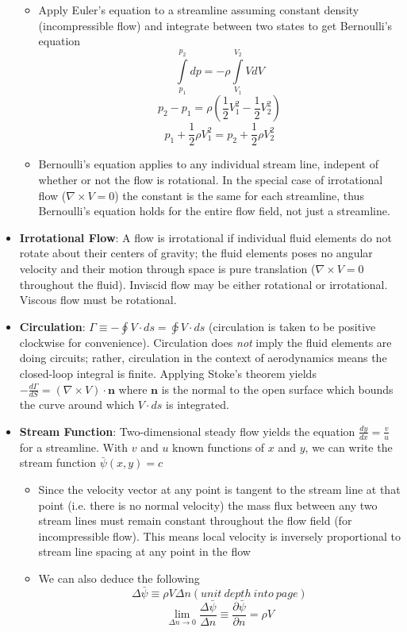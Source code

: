 \documentclass[12pt]{article}
\newcommand{\Item}[1]{\item \textbf{#1}:}
\newcommand{\CenteredBoxed}[1]{\begin{center}\boxed{#1}\end{center}}
\newcommand{\intlim}[2]{\int\limits_{#1}^{#2}}
\begin{document}
\begin{itemize}
\begin{itemize}
	\item Apply Euler's equation to a streamline assuming constant density (incompressible flow) and integrate between two states to get Bernoulli's equation 
	$$\intlim{p_1}{p_2}dp = -\rho\intlim{V_1}{V_2}VdV$$
	$$p_2-p_1 = \rho\left(\frac{1}{2}V_1^2 - \frac{1}{2}V_2^2\right)$$
	$$p_1 + \frac{1}{2}\rho V_1^2 = p_2 + \frac{1}{2}\rho V_2^2$$
	\CenteredBoxed{p+\frac{1}{2}\rho V^2 = const.}
	\item Bernoulli's equation applies to any individual stream line, indepent of whether or not the flow is rotational. In the special case of irrotational flow ($\nabla\times V = 0$) the constant is the same for each streamline, thus Bernoulli's equation holds for the entire flow field, not just a streamline.
	\end{itemize}
\Item{Irrotational Flow} A flow is irrotational if individual fluid elements do not rotate about their centers of gravity; the fluid elements poses no angular velocity and their motion through space is pure translation ($\nabla\times V = 0$ throughout the fluid). Inviscid flow may be either rotational or irrotational. Viscous flow must be rotational.
\Item{Circulation} $\Gamma\equiv-\oint V\cdot ds=\varointclockwise V\cdot ds$ (circulation is taken to be positive clockwise for convenience). Circulation does \emph{not} imply the fluid elements are doing circuits; rather, circulation in the context of aerodynamics means the closed-loop integral is finite. Applying Stoke's theorem yields $-\frac{d\Gamma}{dS} = (\nabla\times V)\cdot\mathbf{n}$ where $\mathbf{n}$ is the normal to the open surface which bounds the curve around which $V\cdot ds$ is integrated.
\Item{Stream Function} Two-dimensional steady flow yields the equation $\frac{dy}{dx} = \frac{v}{u}$ for a streamline. With $v$ and $u$ known functions of $x$ and $y$, we can write the stream function $\bar{\psi}(x,y) = c$
	\begin{itemize}
	\item Since the velocity vector at any point is tangent to the stream line at that point (i.e. there is no normal velocity) the mass flux between any two stream lines must remain constant throughout the flow field (for incompressible flow). This means local velocity is inversely proportional to stream line spacing at any point in the flow
	\item We can also deduce the following
	$$ \Delta\bar{\psi}\equiv\rho V\Delta n(unit\ depth\ into\ page)$$
	$$\lim_{\Delta n\to0}\frac{\Delta\bar{\psi}}{\Delta n}\equiv\frac{\partial\bar{\psi}}{\partial n} = \rho V$$

\end{itemize}
\end{itemize}
\end{document}
